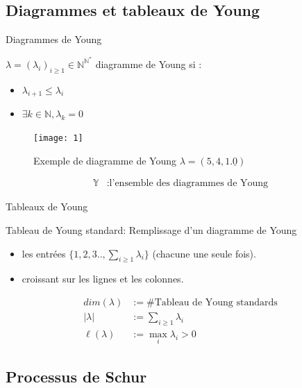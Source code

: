 \documentclass[french]{beamer}
\begin{document}
\subsection{Diagrammes  et tableaux  de Young}
\begin{frame}{Diagrammes de Young}
\begin{definition}
$\lambda=(\lambda_i)_{i\geq 1} \in \mathbb{N}^{\mathbb{N}^*}$ diagramme de Young si :
\begin{itemize}
\item  $\lambda_{i+1}\leq \lambda_i$
\item $\exists k \in \mathbb{N}, \lambda_k=0$
\end{itemize}
\end{definition}
\begin{figure}[ht]
    \centering
  \texttt{[image: 1]}
\caption {Exemple de diagramme de Young $\lambda=(5,4,1.\underline{0})$}
\end{figure}
\begin{align*}\mathbb{Y}&:\text{l'ensemble des diagrammes de Young}
\end{align*}

\end{frame}

\begin{frame}{Tableaux de Young}

\begin{definition}
Tableau de Young standard: Remplissage d'un diagramme de Young
\begin{itemize}
\item les entrées $\{1,2,3..,\sum_{i\geq 1} \lambda_i \}$ (chacune une seule fois). 
\item croissant sur les lignes et les colonnes.
\end{itemize}
\end{definition}
\begin{align*}
dim(\lambda)&:=  \# \text{Tableau de Young standards}
\\|\lambda|&:=\sum_{i\geq 1} \lambda_i \\  \ell(\lambda)&:=\max_i{\lambda_i>0}
\end{align*}

\end{frame}
\begin{frame}

\section{Processus de Schur}
\tableofcontents[currentsection,currentsubsection, 
    hideothersubsections, 
    sectionstyle=show/shaded,
]
\end{frame}
\end{document}
